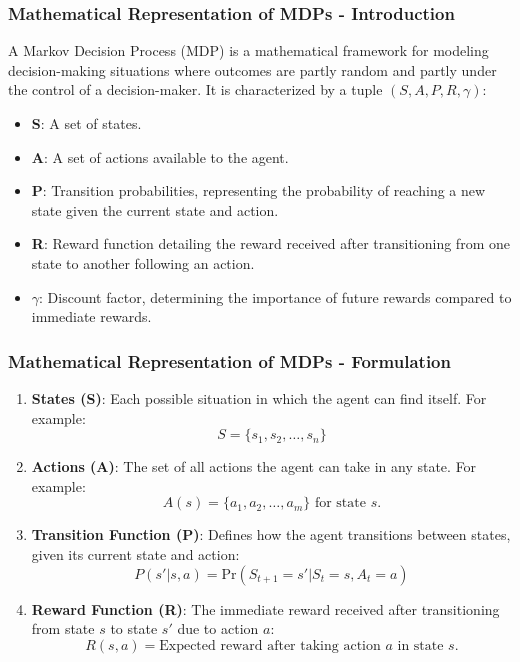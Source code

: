 \documentclass{beamer}
\begin{document}
\begin{frame}[fragile]
    \frametitle{Mathematical Representation of MDPs - Introduction}
    A Markov Decision Process (MDP) is a mathematical framework for modeling decision-making situations where outcomes are partly random and partly under the control of a decision-maker. It is characterized by a tuple \( (S, A, P, R, \gamma) \):
    \begin{itemize}
        \item \textbf{S}: A set of states.
        \item \textbf{A}: A set of actions available to the agent.
        \item \textbf{P}: Transition probabilities, representing the probability of reaching a new state given the current state and action.
        \item \textbf{R}: Reward function detailing the reward received after transitioning from one state to another following an action.
        \item \textbf{$\gamma$}: Discount factor, determining the importance of future rewards compared to immediate rewards.
    \end{itemize}
\end{frame}

\begin{frame}[fragile]
    \frametitle{Mathematical Representation of MDPs - Formulation}
    \begin{enumerate}
        \item \textbf{States (S)}: Each possible situation in which the agent can find itself. For example:  
        \[
        S = \{s_1, s_2, \ldots, s_n\}
        \]

        \item \textbf{Actions (A)}: The set of all actions the agent can take in any state. For example:  
        \[
        A(s) = \{a_1, a_2, \ldots, a_m\} \text{ for state } s.
        \]

        \item \textbf{Transition Function (P)}: Defines how the agent transitions between states, given its current state and action: 
        \[
        P(s' | s, a) = \text{Pr}(S_{t+1} = s' | S_t = s, A_t = a)
        \]

        \item \textbf{Reward Function (R)}: The immediate reward received after transitioning from state \( s \) to state \( s' \) due to action \( a \):
        \[
        R(s, a) = \text{Expected reward after taking action } a \text{ in state } s.
        \]
    \end{enumerate}
\end{frame}
\end{document}
